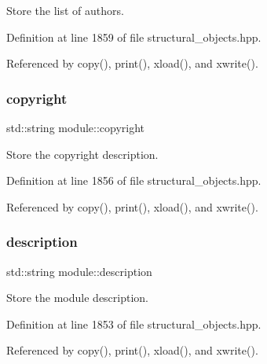 Store the list of authors. 



Definition at line 1859 of file structural\+\_\+objects.\+hpp.



Referenced by copy(), print(), xload(), and xwrite().

\mbox{\label{classmodule_acc39ee17da33ea6d545e7d3d46262096}} 
\subsubsection{\texorpdfstring{copyright}{copyright}}
{\footnotesize\ttfamily std\+::string module\+::copyright\hspace{0.3cm}{\ttfamily [private]}}



Store the copyright description. 



Definition at line 1856 of file structural\+\_\+objects.\+hpp.



Referenced by copy(), print(), xload(), and xwrite().

\mbox{\label{classmodule_a7afe74efac4110a3ebcdd87e5bdc013a}} 
\subsubsection{\texorpdfstring{description}{description}}
{\footnotesize\ttfamily std\+::string module\+::description\hspace{0.3cm}{\ttfamily [private]}}



Store the module description. 



Definition at line 1853 of file structural\+\_\+objects.\+hpp.



Referenced by copy(), print(), xload(), and xwrite().

\mbox{\label{classmodule_adcd579200b0fcf4ed6f583700b86aad8}} 
